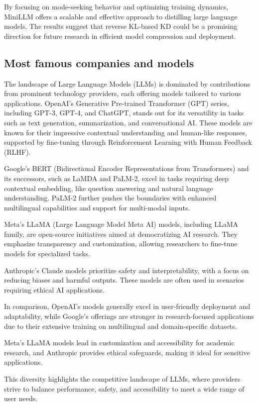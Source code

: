 By focusing on mode-seeking behavior and optimizing training dynamics, MiniLLM offers a scalable and effective approach to distilling large language models. The results suggest that reverse KL-based KD could be a promising direction for future research in efficient model compression and deployment.


\subsection{Most famous companies and models}
The landscape of Large Language Models (LLMs) is dominated by contributions from prominent technology providers, each offering models tailored to various applications. OpenAI's Generative Pre-trained Transformer (GPT) series, including GPT-3, GPT-4, and ChatGPT, stands out for its versatility in tasks such as text generation, summarization, and conversational AI. These models are known for their impressive contextual understanding and human-like responses, supported by fine-tuning through Reinforcement Learning with Human Feedback (RLHF).

Google's BERT (Bidirectional Encoder Representations from Transformers) and its successors, such as LaMDA and PaLM-2, excel in tasks requiring deep contextual embedding, like question answering and natural language understanding. PaLM-2 further pushes the boundaries with enhanced multilingual capabilities and support for multi-modal inputs.

Meta's LLaMA (Large Language Model Meta AI) models, including LLaMA family, are open-source initiatives aimed at democratizing AI research. They emphasize transparency and customization, allowing researchers to fine-tune models for specialized tasks.

Anthropic’s Claude models prioritize safety and interpretability, with a focus on reducing biases and harmful outputs. These models are often used in scenarios requiring ethical AI applications.

In comparison, OpenAI's models generally excel in user-friendly deployment and adaptability, while Google's offerings are stronger in research-focused applications due to their extensive training on multilingual and domain-specific datasets.

Meta’s LLaMA models lead in customization and accessibility for academic research, and Anthropic provides ethical safeguards, making it ideal for sensitive applications.

This diversity highlights the competitive landscape of LLMs, where providers strive to balance performance, safety, and accessibility to meet a wide range of user needs.

